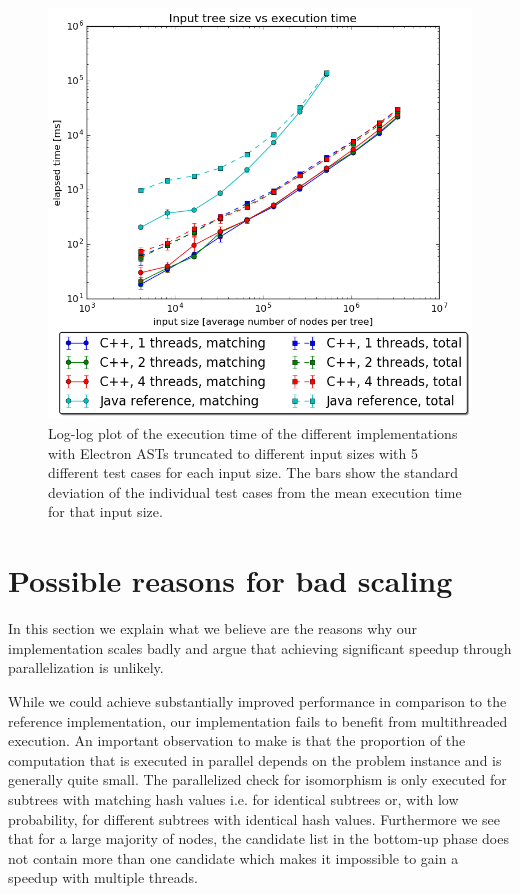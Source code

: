 \documentclass[letterpaper]{article}
\begin{document}
\begin{figure}
	\includegraphics[width=\linewidth]{measurements/electron/timePlot}
	\caption{Log-log plot of the execution time of the different implementations with Electron ASTs truncated to different input sizes with 5 different test cases for each input size. The bars show the standard deviation of the individual test cases from the mean execution time for that input size.}
	\label{fig:electron_time}
\end{figure}

\section{Possible reasons for bad scaling}
\label{bad_scaling}

In this section we explain what we believe are the reasons why our implementation scales badly and argue that achieving significant speedup through parallelization is unlikely.

While we could achieve substantially improved performance in comparison to the reference implementation, our implementation fails to benefit from multithreaded execution.
An important observation to make is that the proportion of the computation that is executed in parallel depends on the problem instance and is generally quite small.
The parallelized check for isomorphism is only executed for subtrees with matching hash values i.e. for identical subtrees or, with low probability, for different subtrees with identical hash values.
Furthermore we see that for a large majority of nodes, the candidate list in the bottom-up phase does not contain more than one candidate which makes it impossible to gain a speedup with multiple threads.
\end{document}
